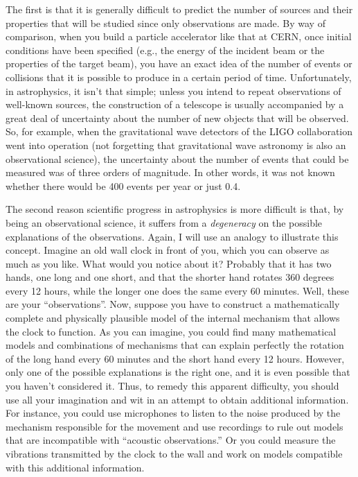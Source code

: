 The first is that it is generally difficult to predict the number of sources and their
properties that will be studied since only observations are made. By way of comparison,
when you build a particle accelerator like that at CERN, once initial
conditions have been specified (e.g., the energy of the incident beam or the properties
of the target beam), you have an exact idea of the number of events or collisions that
it is possible to produce in a certain period of time. Unfortunately, in astrophysics,
it isn't that simple; unless you intend to repeat observations of well-known sources,
the construction of a telescope is usually accompanied by a great deal of uncertainty
about the number of new objects that will be observed. So, for example, when the
gravitational wave detectors of the LIGO  collaboration went into
operation (not forgetting that gravitational wave astronomy is also an observational
science), the uncertainty about the number of events that could be measured was of three
orders of magnitude. In other words, it was not known whether there would be 400 events
per year or just 0.4.

The second reason scientific progress in astrophysics is more difficult is that, by
being an observational science, it suffers from a \emph{degeneracy} on
the possible explanations of the observations. Again, I will use an analogy to
illustrate this concept. Imagine an old wall clock in front of you, which you can
observe as much as you like. What would you notice about it? Probably that it has two
hands, one long and one short, and that the shorter hand rotates 360 degrees every 12
hours, while the longer one does the same every 60 minutes. Well, these are your
``observations''. Now, suppose you have to construct a mathematically complete and
physically plausible model of the internal mechanism that allows the clock to function.
As you can imagine, you could find many mathematical models and combinations of
mechanisms that can explain perfectly the rotation of the long hand every 60 minutes and
the short hand every 12 hours. However, only one of the possible explanations is the
right one, and it is even possible that you haven't considered it. Thus, to remedy this
apparent difficulty, you should use all your imagination and wit in an attempt to obtain
additional information. For instance, you could use microphones to listen to the
noise produced by the mechanism responsible for the
movement and use recordings to rule out models that are incompatible with ``acoustic
observations.'' Or you could measure the vibrations transmitted by the clock to the wall
and work on models compatible with this additional information.

